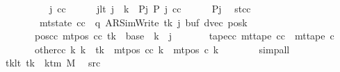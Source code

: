 \begin{isabellebody}
\ \ \isamarkupfalse%
\ {\isacharminus}{\kern0pt}\isanewline
\ \ \ \ \isamarkupfalse%
\ j\ cc\isanewline
\ \ \ \ \isamarkupfalse%
\ jlt{\isacharcolon}{\kern0pt}\ {\isachardoublequoteopen}j\ {\isacharless}{\kern0pt}\ {\isacharquery}{\kern0pt}k{\isachardoublequoteclose}\ \ Pj{\isacharcolon}{\kern0pt}\ {\isachardoublequoteopen}{\isacharquery}{\kern0pt}P\ j\ cc{\isachardoublequoteclose}\isanewline
\ \ \ \ \isamarkupfalse%
\ Pj\ \isamarkupfalse%
\ st{\isacharunderscore}{\kern0pt}cc{\isacharcolon}{\kern0pt}\isanewline
\ \ \ \ \ \ \ \ {\isachardoublequoteopen}mt{\isacharunderscore}{\kern0pt}state\ cc\ {\isacharequal}{\kern0pt}\ {\isacharparenleft}{\kern0pt}q{\isacharcomma}{\kern0pt}\ AR{\isacharunderscore}{\kern0pt}SimWrite{\isacharcomma}{\kern0pt}\ tk{\isacharcomma}{\kern0pt}\ j{\isacharcomma}{\kern0pt}\ buf{\isacharcomma}{\kern0pt}\ dvec{\isacharcomma}{\kern0pt}\ posk{\isacharparenright}{\kern0pt}{\isachardoublequoteclose}\isanewline
\ \ \ \ \ \ \ pos{\isacharunderscore}{\kern0pt}cc{\isacharcolon}{\kern0pt}\ {\isachardoublequoteopen}mt{\isacharunderscore}{\kern0pt}pos\ cc\ tk\ {\isacharequal}{\kern0pt}\ base\ {\isacharplus}{\kern0pt}\ {\isacharparenleft}{\kern0pt}{\isacharquery}{\kern0pt}k\ {\isacharminus}{\kern0pt}\ j{\isacharparenright}{\kern0pt}{\isachardoublequoteclose}\isanewline
\ \ \ \ \ \ \ tape{\isacharunderscore}{\kern0pt}cc{\isacharcolon}{\kern0pt}\ {\isachardoublequoteopen}mt{\isacharunderscore}{\kern0pt}tape\ cc\ {\isacharequal}{\kern0pt}\ mt{\isacharunderscore}{\kern0pt}tape\ c{}{\isachardoublequoteclose}\isanewline
\ \ \ \ \ \ \ other{\isacharunderscore}{\kern0pt}cc{\isacharcolon}{\kern0pt}\ {\isachardoublequoteopen}{\isasymforall}k{\isacharprime}{\kern0pt}{\isachardot}{\kern0pt}\ k{\isacharprime}{\kern0pt}\ {\isasymnoteq}\ tk\ {\isasymlongrightarrow}\ mt{\isacharunderscore}{\kern0pt}pos\ cc\ k{\isacharprime}{\kern0pt}\ {\isacharequal}{\kern0pt}\ mt{\isacharunderscore}{\kern0pt}pos\ c{}\ k{\isacharprime}{\kern0pt}{\isachardoublequoteclose}\isanewline
\ \ \ \ \ \ \isamarkupfalse%
\ simp{\isacharunderscore}{\kern0pt}all\isanewline
\ \ \ \ \isamarkupfalse%
\ tk{\isacharunderscore}{\kern0pt}lt{\isacharcolon}{\kern0pt}\ {\isachardoublequoteopen}tk\ {\isacharless}{\kern0pt}\ k{\isacharunderscore}{\kern0pt}tm\ M{\isachardoublequoteclose}\ \isamarkupfalse%
\ src{}\ \isamarkupfalse%

\end{isabellebody}
